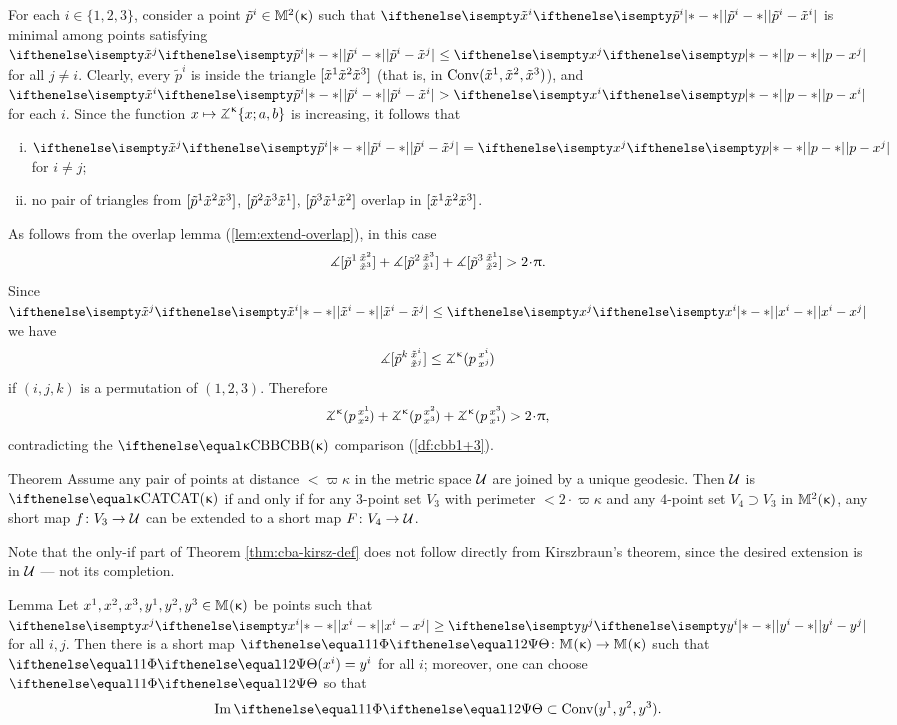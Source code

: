 For each $i\in \{1,2,3\}$, consider a point $\tilde p^i\in\Lob2\kappa$ such that $\dist{\tilde p^i}{\tilde x^i}{}$ is minimal among points satisfying $\dist{\tilde p^i}{\tilde x^j}{}\le\dist{p}{ x^j}{}$ for all $j\ne i$. 
Clearly, every $\tilde p^i$ is inside the triangle $[{\tilde x^1}{\tilde x^2}{\tilde x^3}]$ (that is, in $\mathop{\rm Conv}\nolimits(\tilde x^1,\tilde x^2,\tilde x^3)$), and $\dist{\tilde p^i}{\tilde x^i}{}>\dist{p}{ x^i}{}$ for each $i$.
Since the function $x\mapsto\tangle\mc\kappa\{x;a,b\}$
is increasing, it follows that
\begin{enumerate}[(i)]
\item $\dist{\tilde p^i}{\tilde x^j}{}=\dist{p}{ x^j}{}$ for $i\ne j$;
\item no pair of triangles from $[{\tilde p^1}{\tilde x^2}{\tilde x^3}]$, $[{\tilde p^2}{\tilde x^3}{\tilde x^1}]$, $[{\tilde p^3}{\tilde x^1}{\tilde x^2}]$ overlap in $[{\tilde x^1}{\tilde x^2}{\tilde x^3}]$.
\end{enumerate}

As follows from the overlap lemma (\ref{lem:extend-overlap}), 
in this case 
\[\mangle\hinge {\tilde p^1}{\tilde x^2}{\tilde x^3} 
+\mangle\hinge {\tilde p^2}{\tilde x^3}{\tilde x^1}
+\mangle\hinge {\tilde p^3}{\tilde x^1}{\tilde x^2}
>2\cdot\pi.
\]
Since $\dist{\tilde x^i}{\tilde x^j}{}\le\dist{x^i}{x^j}{}$ we have
\[\mangle\hinge {\tilde p^\kay}{\tilde x^i}{\tilde x^j}
\le
\angk\kappa p{x^i}{x^j}\]
if $(i,j,k)$ is a permutation of $(1,2,3)$.
Therefore 
\[\angk\kappa p{x^1}{x^2}+\angk\kappa p{x^2}{x^3}+\angk\kappa p{x^3}{x^1}>2\cdot\pi,\]
contradicting the $\Alex\kappa$ comparison (\ref{df:cbb1+3}).
\qeds

\begin{thm}{Theorem}\label{thm:cba-kirsz-def} 
Assume any pair of points at distance $<\varpi\kappa$ in the metric space $\mathcal{U}$ are joined by a unique geodesic. 
Then $\mathcal{U}$ is $\CAT\kappa$ if and only if 
for any $3$-point set $V_3$ with perimeter $<2\cdot\varpi\kappa$
and any $4$-point set $V_4\supset V_3$ in $\mathbb{M}_{{}}^{2}({\upkappa})$,
any short map $f\:V_3\to\spc{U}$ can be extended to a short map $F\:V_4\to\spc{U}$.
\end{thm}

Note that the only-if part of Theorem \ref{thm:cba-kirsz-def} does not follow directly from Kirszbraun's theorem, since the desired extension is in $\mathcal{U}$ --- not its completion.

\begin{thm}{Lemma}\label{lem:smaller-trig}
Let $x^1,x^2,x^3,y^1,y^2,y^3\in\Lob{}{\kappa}$
be points such that $\dist{x^i}{x^j}{}\ge\dist{y^i}{y^j}{}$ for all $i,j$.
Then there is a short map $\map\:\Lob{}{\kappa}\to\Lob{}{\kappa}$ such that $\map(x^i)=y^i$ for all $i$;
moreover, one can choose $\map$ so that 
\[\Im \map\subset\Conv(y^1,y^2,y^3).\]

\end{thm}

